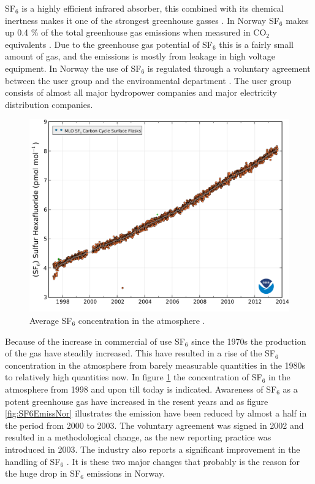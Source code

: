 \documentclass[10pt,a4paper]{article} %
\begin{document}
SF$_6$ is a highly efficient infrared absorber, this combined with its chemical inertness makes it one of the strongest greenhouse gasses \cite{bib:SF6PI}. In Norway SF$_6$ makes up 0.4 \% of the total greenhouse gas emissions when measured in CO$_2$ equivalents \cite{bib:KlimaKur2020}. Due to the greenhouse gas potential of SF$_6$ this is a fairly small amount of gas, and the emissions is mostly from leakage in high voltage equipment. In Norway the use of SF$_6$ is regulated through a voluntary agreement between the user group
and the environmental department \cite{bib:KlimaKur2020}. The user group consists of almost all major hydropower companies and major electricity distribution companies.


\begin{figure}[H]
\centering
\includegraphics[scale=0.4]{Bilder/Theory/consentrationSF6.png}
\caption{Average SF$_6$ concentration in the atmosphere \cite{bib:consSF6}.} \label{fig:conSF6}
\end{figure}

Because of the increase in commercial of use SF$_6$ since the 1970s the production of the gas have steadily increased. This have resulted in a rise of the SF$_6$ concentration in the atmosphere from barely measurable quantities in the 1980s \cite{bib:SF6PI} to relatively high quantities now. In figure \ref{fig:conSF6} the concentration of SF$_6$ in the atmosphere from 1998 and upon till today is indicated. Awareness of SF$_6$ as a potent greenhouse gas have increased in the resent years and as figure \ref{fig:SF6EmissNor} illustrates the emission have been reduced by almost a half in the period from 2000 to 2003. The voluntary agreement was signed in 2002 \cite{bib:regSF6Miljo} and resulted in a methodological change, as the new reporting practice was introduced in 2003. The industry also reports a significant improvement in the handling of SF$_6$ \cite{bib:StatSF6}. It is these two major changes that probably is the reason for the huge drop in SF$_6$ emissions in Norway. 
\end{document}
